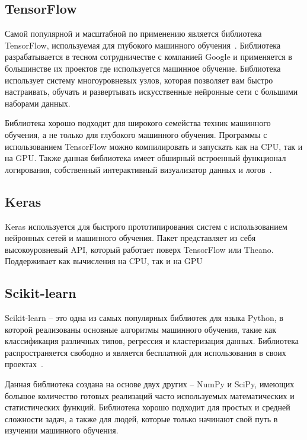 

\subsection{TensorFlow}
Самой популярной и масштабной по применению является библиотека TensorFlow, используемая для глубокого машинного обучения~\cite{gudfellow}. Библиотека разрабатывается в тесном сотрудничестве с компанией Google и применяется в большинстве их проектов где используется машинное обучение. Библиотека использует систему многоуровневых узлов, которая позволяет вам быстро настраивать, обучать и развертывать искусственные нейронные сети с большими наборами данных.


Библиотека хорошо подходит для широкого семейства техник машинного обучения, а не только для глубокого машинного обучения. Программы с использованием TensorFlow можно компилировать и запускать как на CPU, так и на GPU. Также данная библиотека имеет обширный встроенный функционал логирования, собственный интерактивный визуализатор данных и логов~\cite{muller}.

\subsection{Keras}

Keras используется для быстрого прототипирования систем с использованием нейронных сетей и машинного обучения. Пакет представляет из себя высокоуровневый API, который работает поверх TensorFlow или Theano. Поддерживает как вычисления на CPU, так и на GPU

\subsection{Scikit-learn}

Scikit-learn -- это одна из самых популярных библиотек для языка Python, в которой реализованы основные алгоритмы машинного обучения, такие как классификация различных типов, регрессия и кластеризация данных. Библиотека распространяется свободно и является бесплатной для использования в своих проектах~\cite{rashka}.


Данная библиотека создана на основе двух других -- NumPy и SciPy, имеющих большое количество готовых реализаций часто используемых математических и статистических функций. Библиотека хорошо подходит для простых и средней сложности задач, а также для людей, которые только начинают свой путь в изучении машинного обучения.


